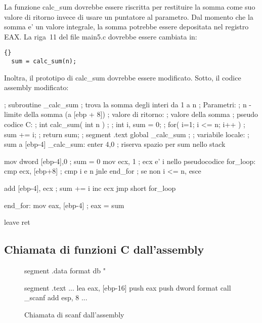 La funzione {\code calc\_sum} dovrebbe essere riscritta per restituire
la somma come suo valore di ritorno invece di usare un puntatore al 
parametro. Dal momento che la somma e' un valore integrale, la somma
potrebbe essere depositata nel registro EAX. La riga~11 del file {\code main5.c}
dovrebbe essere cambiata in:
\begin{lstlisting}[stepnumber=0]{}
  sum = calc_sum(n);
\end{lstlisting}
Inoltra, il prototipo di {\code calc\_sum} dovrebbe essere modificato.
Sotto, il codice assembly modificato:
\begin{AsmCodeListing}[label=sub6.asm]
; subroutine _calc_sum
; trova la somma degli interi da 1 a n
; Parametri:
;   n    - limite della somma (a [ebp + 8])
; valore di ritorno:
;   valore della somma
; pseudo codice C:
; int calc_sum( int n )
; {
;   int i, sum = 0;
;   for( i=1; i <= n; i++ )
;     sum += i;
;   return sum;
; }
segment .text
        global  _calc_sum
;
; variabile locale:
;   sum a [ebp-4]
_calc_sum:
        enter   4,0               ; riserva spazio per sum nello stack

        mov     dword [ebp-4],0   ; sum = 0
        mov     ecx, 1            ; ecx e' i nello pseudocodice
for_loop:
        cmp     ecx, [ebp+8]      ; cmp i e n
        jnle    end_for           ; se non i <= n, esce

        add     [ebp-4], ecx      ; sum += i
        inc     ecx
        jmp     short for_loop

end_for:
        mov     eax, [ebp-4]      ; eax = sum

        leave
        ret
\end{AsmCodeListing}

\subsection{Chiamata di funzioni C dall'assembly}

\begin{figure}[t]
\begin{AsmCodeListing}[frame=single]
segment .data
format       db "%

segment .text
...
      lea    eax, [ebp-16]
      push   eax
      push   dword format
      call   _scanf
      add    esp, 8
...
\end{AsmCodeListing}
\caption{Chiamata di {\code scanf} dall'assembly\label{fig:scanf}}
\end{figure}

